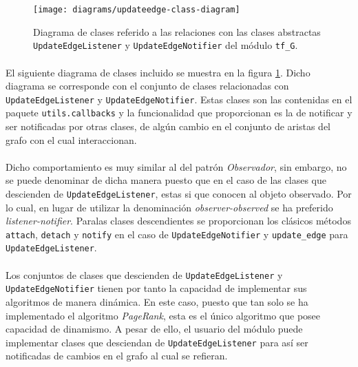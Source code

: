 \documentclass{subfiles}
\begin{document}
          \begin{figure}[h!]
            \centering
            \texttt{[image: diagrams/updateedge-class-diagram]}
            \caption{Diagrama de clases referido a las relaciones con las clases abstractas \texttt{UpdateEdgeListener} y \texttt{UpdateEdgeNotifier} del módulo \texttt{tf\_G}.}
            \label{img:update_edge_diagram}
          \end{figure}

          \paragraph{}
          El siguiente diagrama de clases incluido se muestra en la figura \ref{img:update_edge_diagram}. Dicho diagrama se corresponde con el conjunto de clases relacionadas con \texttt{UpdateEdgeListener} y \texttt{UpdateEdgeNotifier}. Estas clases son las contenidas en el paquete \texttt{utils.callbacks} y la funcionalidad que proporcionan es la de notificar y ser notificadas por otras clases, de algún cambio en el conjunto de aristas del grafo con el cual interaccionan.

          \paragraph{}
          Dicho comportamiento es muy similar al del patrón \emph{Observador}, sin embargo, no se puede denominar de dicha manera puesto que en el caso de las clases que descienden de \texttt{UpdateEdgeListener}, estas si que conocen al objeto observado. Por lo cual, en lugar de utilizar la denominación \emph{observer-observed} se ha preferido \emph{listener-notifier}. Paralas clases descendientes se proporcionan los clásicos métodos \texttt{attach}, \texttt{detach} y \texttt{notify} en el caso de \texttt{UpdateEdgeNotifier} y \texttt{update\_edge} para \texttt{UpdateEdgeListener}.

          \paragraph{}
          Los conjuntos de clases que descienden de \texttt{UpdateEdgeListener} y \texttt{UpdateEdgeNotifier} tienen por tanto la capacidad de implementar sus algoritmos de manera dinámica. En este caso, puesto que tan solo se ha implementado el algoritmo \emph{PageRank}, esta es el único algoritmo que posee capacidad de dinamismo. A pesar de ello, el usuario del módulo puede implementar clases que desciendan de \texttt{UpdateEdgeListener} para así ser notificadas de cambios en el grafo al cual se refieran.
\end{document}
